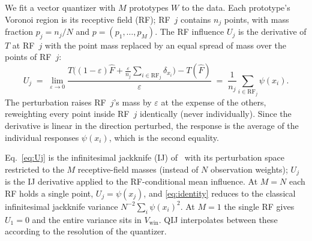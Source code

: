 \documentclass[runningheads]{llncs}
\newcommand{\ifl}{\psi}
\begin{document}
We fit a vector quantizer with $M$ prototypes $W$ to the data. Each
prototype's Voronoi region is its receptive field (RF); RF~$j$ contains $n_j$
points, with mass fraction $p_j = n_j/N$ and $p = (p_1,\dots,p_M)$. The RF
influence $U_j$ is the derivative of $T$ at RF~$j$ with the point mass replaced by an equal spread of mass over the points of RF~$j$:
%
\begin{equation}\label{eq:Uj}
  U_j \;=\; \lim_{\varepsilon \to 0}
  \frac{T\!\Big((1-\varepsilon)\hat{F}
        + \frac{\varepsilon}{n_j}\sum_{i \in \mathrm{RF}_j} \delta_{x_i}\Big)
        - T(\hat{F})}{\varepsilon}
  \;=\; \frac{1}{n_j} \sum_{i \in \mathrm{RF}_j} \psi(x_i).
\end{equation}
%
The perturbation raises RF~$j$'s mass by $\varepsilon$ at the expense of the
others, reweighting every point inside RF~$j$ identically (never individually).
Since the derivative is linear in the direction perturbed, the response is the
average of the individual responses $\psi(x_i)$, which is the second equality.

Eq.~\eqref{eq:Uj} is the infinitesimal jackknife (IJ) of~\cite{jaeckel1972} with its perturbation space restricted to the $M$ receptive-field masses (instead of $N$ observation weights); $U_j$ is the IJ derivative applied to the RF-conditional mean influence. At $M = N$ each RF holds a
single point, $U_j = \psi(x_j)$, and \eqref{eq:identity} reduces to the classical infinitesimal jackknife variance $N^{-2}\sum_i \psi(x_i)^2$. At $M = 1$ the single RF gives $U_1 = 0$ and the entire variance sits in
$V_\mathrm{win}$. QIJ interpolates between these according to the
resolution of the quantizer.

\end{document}
